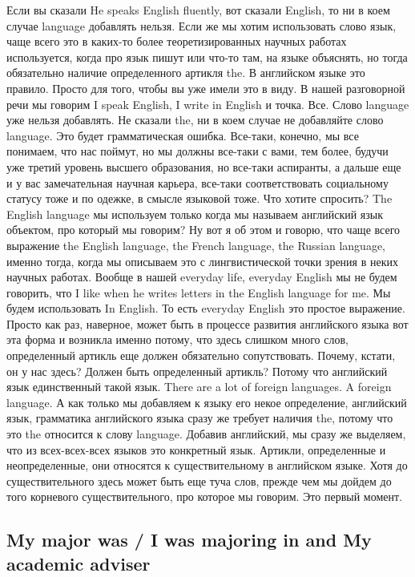 \documentclass[main.tex]{subfiles}
\begin{document}
Если вы сказали He speaks English fluently, вот сказали English, то ни в коем случае language добавлять нельзя.
Если же мы хотим использовать слово язык, чаще всего это в каких-то более теоретизированных научных работах используется, когда про язык пишут или что-то там, на языке объяснять, но тогда обязательно наличие определенного артикля the.
В английском языке это правило.
Просто для того, чтобы вы уже имели это в виду.
В нашей разговорной речи мы говорим I speak English, I write in English и точка.
Все.
Слово language уже нельзя добавлять.
Не сказали the, ни в коем случае не добавляйте слово language.
Это будет грамматическая ошибка.
Все-таки, конечно, мы все понимаем, что нас поймут, но мы должны все-таки с вами, тем более, будучи уже третий уровень высшего образования, но все-таки аспиранты, а дальше еще и у вас замечательная научная карьера, все-таки соответствовать социальному статусу тоже и по одежке, в смысле языковой тоже.
Что хотите спросить? The English language мы используем только когда мы называем английский язык объектом, про который мы говорим?
Ну вот я об этом и говорю, что чаще всего выражение the English language, the French language, the Russian language, именно тогда, когда мы описываем это с лингвистической точки зрения в неких научных работах.
Вообще в нашей everyday life, everyday English мы не будем говорить, что I like when he writes letters in the English language for me.
Мы будем использовать In English.
То есть everyday English это простое выражение.
Просто как раз, наверное, может быть в процессе развития английского языка вот эта форма и возникла именно потому, что здесь слишком много слов, определенный артикль еще должен обязательно сопутствовать.
Почему, кстати, он у нас здесь?
Должен быть определенный артикль?
Потому что английский язык единственный такой язык.
There are a lot of foreign languages.
A foreign language.
А как только мы добавляем к языку его некое определение, английский язык, грамматика английского языка сразу же требует наличия the, потому что это the относится к слову language.
Добавив английский, мы сразу же выделяем, что из всех-всех-всех языков это конкретный язык.
Артикли, определенные и неопределенные, они относятся к существительному в английском языке.
Хотя до существительного здесь может быть еще туча слов, прежде чем мы дойдем до того корневого существительного, про которое мы говорим.
Это первый момент.

\subsection{My major was / I was majoring in and My academic adviser}
\end{document}
